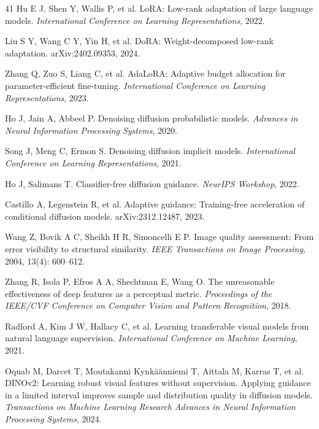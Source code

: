 \documentclass[times,twocolumn,final]{elsarticle}
\providecommand{\DIFadd}[1]{{\protect\color{blue} \sf #1}} %
\providecommand{\DIFdel}[1]{{\protect\color{red} \scriptsize #1}} %
\providecommand{\DIFaddbegin}{} %
\providecommand{\DIFaddend}{} %
\providecommand{\DIFdelbegin}{} %
\providecommand{\DIFdelend}{} %
\newcommand{\DIFscaledelfig}{0.5}
\newlength{\DIFdelgraphicswidth} %
\newlength{\DIFdelgraphicsheight} %
\newcommand{\DIFaddincludegraphics}[2][]{{\color{blue}\fbox{\DIFOincludegraphics[#1]{#2}}}} %
\newcommand{\DIFdelincludegraphics}[2][]{%
\sbox{\DIFdelgraphicsbox}{\DIFOincludegraphics[#1]{#2}}%
\settoboxwidth{\DIFdelgraphicswidth}{\DIFdelgraphicsbox} %
\settoboxtotalheight{\DIFdelgraphicsheight}{\DIFdelgraphicsbox} %
\scalebox{\DIFscaledelfig}{%
\parbox[b]{\DIFdelgraphicswidth}{\usebox{\DIFdelgraphicsbox}\\[-\baselineskip] \rule{\DIFdelgraphicswidth}{0em}}\llap{\resizebox{\DIFdelgraphicswidth}{\DIFdelgraphicsheight}{%
\setlength{\unitlength}{\DIFdelgraphicswidth}%
\begin{picture}(1,1)%
\thicklines\linethickness{2pt} %
{\color[rgb]{1,0,0}\put(0,0){\framebox(1,1){}}}%
{\color[rgb]{1,0,0}\put(0,0){\line( 1,1){1}}}%
{\color[rgb]{1,0,0}\put(0,1){\line(1,-1){1}}}%
\end{picture}%
}\hspace*{3pt}}} %
} %
\DeclareRobustCommand{\DIFaddbegin}{\DIFOaddbegin \let\includegraphics\DIFaddincludegraphics} %
\DeclareRobustCommand{\DIFaddend}{\DIFOaddend \let\includegraphics\DIFOincludegraphics} %
\DeclareRobustCommand{\DIFdelbegin}{\DIFOdelbegin \let\includegraphics\DIFdelincludegraphics} %
\DeclareRobustCommand{\DIFdelend}{\DIFOaddend \let\includegraphics\DIFOincludegraphics} %
\begin{document}
\begin{thebibliography}{41}
Hu E J, Shen Y, Wallis P, et al. LoRA: Low-rank adaptation of large language models. \textit{International Conference on Learning Representations}, 2022.

Liu S Y, Wang C Y, Yin H, et al. DoRA: Weight-decomposed low-rank adaptation. arXiv:2402.09353, 2024.

Zhang Q, Zuo S, Liang C, et al. AdaLoRA: Adaptive budget allocation for parameter-efficient fine-tuning. \textit{International Conference on Learning Representations}, 2023.

Ho J, Jain A, Abbeel P. Denoising diffusion probabilistic models. \textit{Advances in Neural Information Processing Systems}, 2020.

Song J, Meng C, Ermon S. Denoising diffusion implicit models. \textit{International Conference on Learning Representations}, 2021.

Ho J, Salimans T. Classifier-free diffusion guidance. \textit{NeurIPS Workshop}, 2022.

Castillo A, Legenstein R, et al. Adaptive guidance: Training-free acceleration of conditional diffusion models. arXiv:2312.12487, 2023.

\DIFdelbegin %
\DIFdel{Wang Z, Bovik A C, Sheikh H R, Simoncelli E P. Image quality assessment: From error visibility to structural similarity. \textit{IEEE Transactions on Image Processing}, 2004, 13(4): 600--612.
}%

\DIFdel{Zhang R, Isola P, Efros A A, Shechtman E, Wang O. The unreasonable effectiveness of deep features as a perceptual metric. \textit{Proceedings of the IEEE/CVF Conference on Computer Vision and Pattern Recognition}, 2018.
}%

\DIFdel{Radford A, Kim J W, Hallacy C, et al. Learning transferable visual models from natural language supervision. \textit{International Conference on Machine Learning}, 2021.
}%

\DIFdel{Oquab M, Darcet T, Moutakanni }\DIFdelend \DIFaddbegin {}
\DIFadd{Kynk\"a\"anniemi T, Aittala M, Karras }\DIFaddend T, et al. \DIFdelbegin \DIFdel{DINOv2: Learning robust visual features without supervision. }\DIFdelend \DIFaddbegin \DIFadd{Applying guidance in a limited interval improves sample and distribution quality in diffusion models. }\DIFaddend \textit{\DIFdelbegin \DIFdel{Transactions on Machine Learning Research}\DIFdelend \DIFaddbegin \DIFadd{Advances in Neural Information Processing Systems}\DIFaddend }, 2024.


\end{thebibliography}
\end{document}
